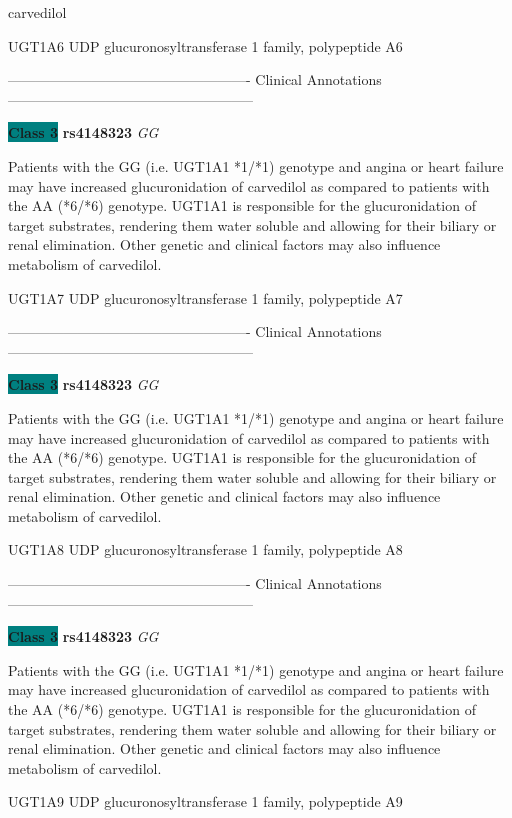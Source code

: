 \documentclass{resume} %
\begin{document}
\begin{rSection}{ carvedilol }
\begin{rSubsection}{ UGT1A6 }{ UDP glucuronosyltransferase 1 family, polypeptide A6 }{}{}
\item[] ---------------------------------------------------- Clinical Annotations -----------------------------------------------------\newline
\item \textbf{\colorbox{teal} {Class 3}} \textbf{ rs4148323 } \textit{ GG }
\item[] Patients with the GG (i.e. UGT1A1 *1/*1) genotype and angina or heart failure may have increased glucuronidation of carvedilol as compared to patients with the AA (*6/*6) genotype. UGT1A1 is responsible for the glucuronidation of target substrates, rendering them water soluble and allowing for their biliary or renal elimination. Other genetic and clinical factors may also influence metabolism of carvedilol.
\end{rSubsection}\begin{rSubsection}{ UGT1A7 }{ UDP glucuronosyltransferase 1 family, polypeptide A7 }{}{}
\item[]

\item[] ---------------------------------------------------- Clinical Annotations -----------------------------------------------------\newline
\item \textbf{\colorbox{teal} {Class 3}} \textbf{ rs4148323 } \textit{ GG }
\item[] Patients with the GG (i.e. UGT1A1 *1/*1) genotype and angina or heart failure may have increased glucuronidation of carvedilol as compared to patients with the AA (*6/*6) genotype. UGT1A1 is responsible for the glucuronidation of target substrates, rendering them water soluble and allowing for their biliary or renal elimination. Other genetic and clinical factors may also influence metabolism of carvedilol.
\end{rSubsection}\begin{rSubsection}{ UGT1A8 }{ UDP glucuronosyltransferase 1 family, polypeptide A8 }{}{}
\item[]

\item[] ---------------------------------------------------- Clinical Annotations -----------------------------------------------------\newline
\item \textbf{\colorbox{teal} {Class 3}} \textbf{ rs4148323 } \textit{ GG }
\item[] Patients with the GG (i.e. UGT1A1 *1/*1) genotype and angina or heart failure may have increased glucuronidation of carvedilol as compared to patients with the AA (*6/*6) genotype. UGT1A1 is responsible for the glucuronidation of target substrates, rendering them water soluble and allowing for their biliary or renal elimination. Other genetic and clinical factors may also influence metabolism of carvedilol.
\end{rSubsection}\begin{rSubsection}{ UGT1A9 }{ UDP glucuronosyltransferase 1 family, polypeptide A9 }{}{}
\item[]


\end{rSubsection}
\end{rSection}
\end{document}
